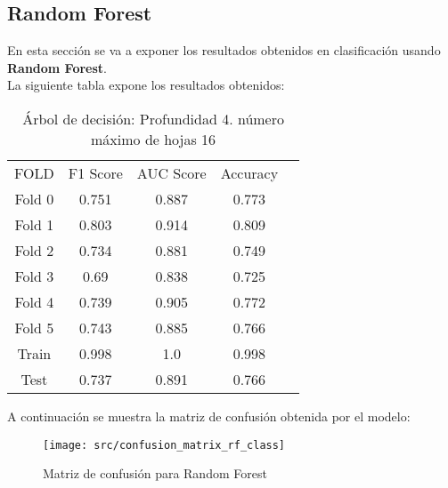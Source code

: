 \subsection{Random Forest}
En esta sección se va a exponer los resultados obtenidos en clasificación usando  \textbf{Random Forest}.\\
La siguiente tabla expone los resultados obtenidos:
\begin{table}[H]
	\centering
	\begin{tabular}{|c|c|c|c|c}
		\cline{1-4}
		FOLD & F1 Score & AUC Score & Accuracy \\ \cline{1-4}
		Fold 0 & 0.751 & 0.887 & 0.773\\ \cline{1-4}
		Fold 1 & 0.803 & 0.914 & 0.809\\ \cline{1-4}
		Fold 2 & 0.734 & 0.881 & 0.749\\ \cline{1-4}
		Fold 3 & 0.69 & 0.838 & 0.725\\ \cline{1-4}
		Fold 4 & 0.739 & 0.905 & 0.772\\ \cline{1-4}
		Fold 5 & 0.743 & 0.885 & 0.766\\ \cline{1-4}
		Train & 0.998 & 1.0 & 0.998\\\cline{1-4}
		Test & 0.737 & 0.891 & 0.766\\\cline{1-4}
	\end{tabular}
	\caption{Árbol de decisión:  Profundidad 4. número máximo de hojas 16}
	\label{tab:rf_class_res}
\end{table}
A continuación se muestra la matriz de confusión obtenida por el modelo:
\begin{figure}[H]
	\centering
	\texttt{[image: src/confusion\_matrix\_rf\_class]}
	\caption{Matriz de confusión para Random Forest}
	\label{fig:confusion_matrix_rf}
\end{figure}



